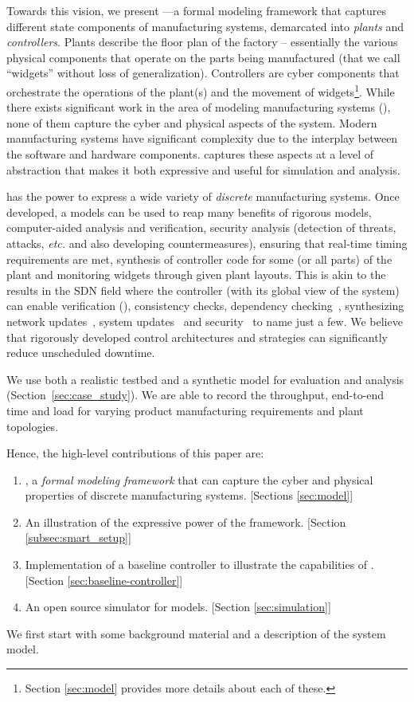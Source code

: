 Towards this vision, we present \mfname---a formal modeling framework that captures different state components of manufacturing systems, demarcated into {\em plants} and {\em
controllers}. Plants describe the floor plan of the factory -- essentially the
various physical components that operate on the parts being manufactured (that
we call ``widgets'' without loss of generalization). Controllers are cyber
components that orchestrate the operations of the plant(s) and the movement of
widgets\footnote{Section \ref{sec:model} provides more details about
each of these.}. While there exists significant work in the area of modeling
manufacturing systems (\eg \cite{desrochers1995applications,askin1993modeling,cassandras1993discrete,zhou1999modeling,jain2001virtual,ezpeleta1995petri}),
none of them capture the cyber and physical aspects of the system. Modern
manufacturing systems have significant complexity due to the interplay between
the software and hardware components.  \mfname captures these aspects at a level of abstraction that makes it both expressive and useful for simulation and analysis.

\mfname has the power to express a wide variety of {\em discrete}
manufacturing systems. Once 
developed, a \mfname models can be used to reap many benefits of rigorous models, \eg~
\ca computer-aided  analysis and verification,
\cb security analysis (detection of threats, attacks, {\em etc.} and also developing countermeasures),
\cc ensuring that real-time timing requirements are met, 
\cd synthesis of controller code for some (or all parts) of the plant and
\ce monitoring widgets through given plant layouts.
This is akin to the results in the SDN field where the controller (with
its global view of the system) can enable verification (\eg \cite{sdn:rei2012,khurshid2012veriflow}), consistency checks\cite{liu2015,liu2015-2},
dependency checking~\cite{mahajan2013consistent}, synthesizing network
updates~\cite{NoyesWCF13}, system updates~\cite{katta2013incremental,ghorbani2012walk}
and security~\cite{sdn:scott-hayward2016} to name just a few. We believe that rigorously developed control architectures and strategies can significantly reduce unscheduled downtime.

We use both a realistic testbed and a synthetic model for evaluation and analysis (Section~\ref{sec:case_study}).
We are able to record the throughput, end-to-end time and load for varying product manufacturing requirements and plant topologies.

Hence, the high-level contributions of this paper are:
\begin{enumerate}
\item \mfname, a \emph{formal modeling framework} that can capture the cyber and physical
properties of discrete manufacturing systems. [Sections \ref{sec:model}]
\item An illustration of the expressive power of the framework. [Section \ref{subsec:smart_setup}]
\item Implementation of a baseline controller to illustrate the capabilities of \mfname. [Section \ref{sec:baseline-controller}]
\item An open source simulator for \mfname models. [Section \ref{sec:simulation}]
\end{enumerate}

We first start with some background material and a description of the system model.
